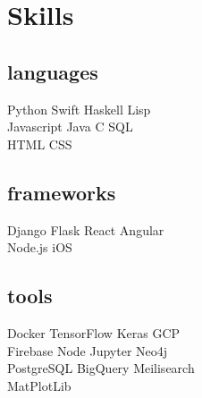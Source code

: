 \documentclass[]{deedy-template}
\begin{document}
\begin{minipage}[t]{0.3\textwidth}
%
%

\section{Skills}
    \subsection{languages}
        Python \textbullet{}
        Swift \textbullet{}
        Haskell \textbullet{}
        Lisp \\
        Javascript \textbullet{} 
        Java \textbullet{}
        C \textbullet{}
        SQL \\
        HTML \textbullet{}
        CSS

    \sectionsep


    \subsection{frameworks}
        Django \textbullet{}
        Flask \textbullet{}
        React \textbullet{}
        Angular \\
        Node.js \textbullet{}
        iOS 

    \sectionsep

    \subsection{tools}
        Docker \textbullet{}
        TensorFlow \textbullet{}
        Keras \textbullet{}
        GCP \\ 
        Firebase \textbullet{}
        Node \textbullet{} 
        Jupyter \textbullet{} 
        Neo4j  \\
        PostgreSQL \textbullet{}
        BigQuery \textbullet{}
        Meilisearch \\
        MatPlotLib

%
%

\end{minipage}
\hfill
\end{document}
